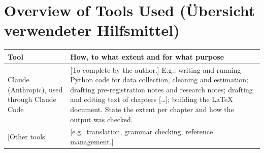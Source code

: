 \chapter*{Overview of Tools Used (Übersicht verwendeter Hilfsmittel)}

\begin{tabularx}{\linewidth}{@{}p{3.6cm}X@{}}
\toprule
Tool & How, to what extent and for what purpose \\
\midrule
Claude (Anthropic), used through Claude Code &
  [To complete by the author.] E.g.: writing and running Python code for data collection, cleaning and estimation;
  drafting pre-registration notes and research notes; drafting and editing text of chapters [\dots]; building the
  LaTeX document. State the extent per chapter and how the output was checked. \\
\addlinespace
{}[Other tools] & [e.g.\ translation, grammar checking, reference management.] \\
\bottomrule
\end{tabularx}

